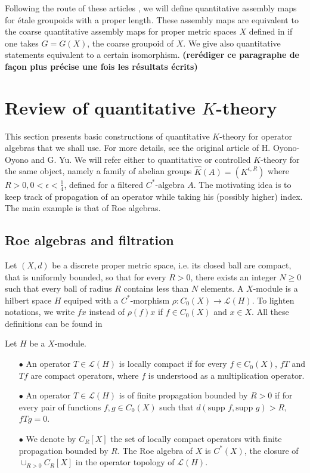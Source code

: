 Following the route of these articles \cite{OY2}\cite{OY3}, we will define quantitative assembly maps for étale groupoids with a proper length. These assembly maps are equivalent to the coarse quantitative assembly maps for proper metric spaces $X$ defined in \cite{OY3} if one takes $G= G(X)$, the coarse groupoid of $X$. We give also quantitative statements equivalent to a certain isomorphism. \textbf{(rerédiger ce paragraphe de façon plus précise une fois les résultats écrits)}\\

\section{Review of quantitative $K$-theory}

This section presents basic constructions of quantitative $K$-theory for operator algebras that we shall use. For more details, see the original article of H. Oyono-Oyono and G. Yu.\cite{OY2} We will refer either to quantitative or controlled $K$-theory for the same object, namely a family of abelian groups $\hat K(A)= (K^{\epsilon,R})$ where $R>0, 0<\epsilon<\frac{1}{4}$, defined for a filtered $C^*$-algebra $A$. The motivating idea is to keep track of propagation of an operator while taking his (possibly higher) index. The main example is that of Roe algebras. \\

\subsection{Roe algebras and filtration}

Let $(X,d)$ be a discrete proper metric space, i.e. its closed ball are compact, that is uniformly bounded, so that for every $R>0$, there exists an integer $N\geq 0$ such that every ball of radius $R$ contains less than $N$ elements. A $X$-module is a hilbert space $H$ equiped with a $C^*$-morphism $\rho : C_0(X)\rightarrow \mathcal L(H)$. To lighten notations, we write $fx$ instead of $\rho(f)x$ if $f\in C_0(X)$ and $x\in X$. All these definitions can be found in \cite{RoeIndex}

\begin{definition}
Let $H$ be a $X$-module.
\begin{itemize}
\item[$\bullet$] An operator $T\in \mathcal L(H)$ is locally compact if for every $f\in C_0(X)$, $fT$ and $Tf$ are compact operators, where $f$ is understood as a multiplication operator.
\item[$\bullet$] An operator $T\in \mathcal L(H)$ is of finite propagation bounded by $R>0$ if for every pair of functions $f,g\in C_0(X)$ such that $d(\text{supp }f , \text{supp }g)>R$, $fTg =0$.
\item[$\bullet$] We denote by $C_R[X]$ the set of locally compact operators with finite propagation bounded by $R$. The Roe algebra of $X$ is $C^*(X)$, the closure of $\cup_{R>0} C_R[X]$ in the operator topology of $\mathcal L(H)$.\\
\end{itemize}
\end{definition} 
 
